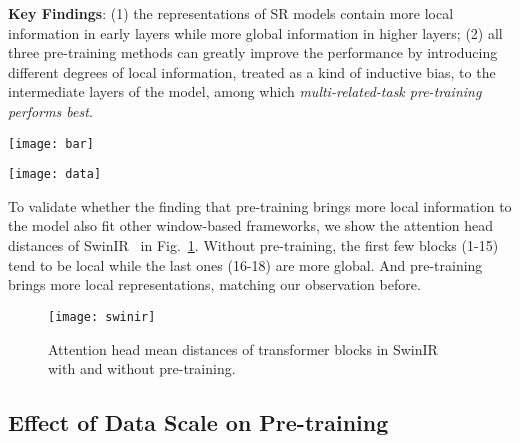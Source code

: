 \documentclass[runningheads]{llncs}
\begin{document}
	\vspace{0.05in}
	\noindent\textbf{Key Findings}: (1) the representations of SR models contain more local information in early layers while more global information in higher layers; (2) all three pre-training methods can greatly improve the performance by introducing different degrees of local information, treated as a kind of inductive bias, to the intermediate layers of the model, among which \textit{multi-related-task pre-training performs best}.
	
	\begin{table}[t]
		\begin{minipage}[c]{0.49\linewidth}
			\centering
			\texttt{[image: bar]}
			\label{fig:bar}
		\end{minipage}\hfill
		\begin{minipage}[c]{0.48\linewidth}
			\centering
			\texttt{[image: data]}
			\label{fig:data}
		\end{minipage}
		\vspace{-0.15in}
	\end{table}
	
	To validate whether the finding that pre-training brings more local information to the model also fit other window-based frameworks, we show the attention head distances of SwinIR~\cite{liang2021swinir} in Fig.~\ref{fig:swinir}. Without pre-training, the first few blocks (1-15) tend to be local while the last ones (16-18) are more global. And pre-training brings more local representations, matching our observation before.
	
	\begin{figure}[t]
		\begin{center}
			\texttt{[image: swinir]}
		\end{center}
		\vspace{-0.2in}
		\caption{Attention head mean distances of transformer blocks in SwinIR~\cite{liang2021swinir} with and without pre-training.}
		\label{fig:swinir}
		\vspace{-0.15in}
	\end{figure}
	


	\subsection{Effect of Data Scale on Pre-training}
	\label{sec:scale}
	
\end{document}
